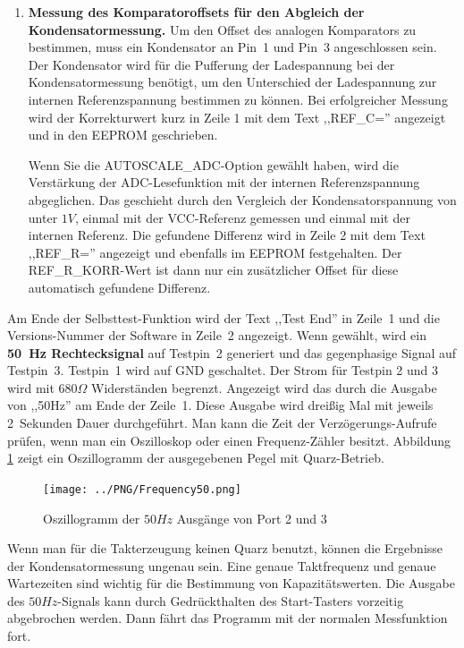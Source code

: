 \begin{enumerate}
\item {\bf Messung des Komparatoroffsets für den Abgleich der Kondensatormessung.}
Um den Offset des analogen Komparators zu bestimmen, muss ein Kondensator an Pin~1 und Pin~3 angeschlossen sein.
Der Kondensator wird für die Pufferung der Ladespannung bei der Kondensatormessung benötigt, um den Unterschied der 
Ladespannung zur internen Referenzspannung bestimmen zu können.
Bei erfolgreicher Messung wird der Korrekturwert kurz in Zeile 1 mit dem Text ,,REF\_C='' angezeigt und in den EEPROM geschrieben.

Wenn Sie die AUTOSCALE\_ADC-Option gewählt haben, wird die Verstärkung der ADC-Lesefunktion mit der
internen Referenzspannung abgeglichen. Das geschieht durch den Vergleich der Kondensatorspannung von unter \(1V\), einmal mit
der VCC-Referenz gemessen und einmal mit der internen Referenz.
Die gefundene Differenz wird in Zeile 2 mit dem Text ,,REF\_R='' angezeigt und ebenfalls im EEPROM festgehalten.
Der REF\_R\_KORR-Wert ist dann nur ein zusätzlicher Offset für diese automatisch gefundene Differenz.

\end{enumerate}

Am Ende der Selbsttest-Funktion wird der Text ,,Test End'' in Zeile~1 und die Versions-Nummer der Software in Zeile~2 angezeigt.
Wenn gewählt, wird ein {\bf 50~Hz Rechtecksignal} auf Testpin~2 generiert und das gegenphasige Signal auf Testpin~3.
Testpin~1 wird auf GND geschaltet. Der Strom für Testpin 2 und 3 wird mit \(680\Omega\) Widerständen begrenzt.
Angezeigt wird das durch die Ausgabe von ,,50Hz'' am Ende der Zeile~1.
Diese Ausgabe wird dreißig Mal mit jeweils 2~Sekunden Dauer durchgeführt.
Man kann die Zeit der Verzögerungs-Aufrufe prüfen, wenn man ein Oszilloskop oder einen
Frequenz-Zähler besitzt. Abbildung \ref{fig:Frequency50} zeigt ein Oszillogramm der ausgegebenen Pegel mit Quarz-Betrieb.

\begin{figure}[H]
\centering
\texttt{[image: ../PNG/Frequency50.png]}
\caption{Oszillogramm der \(50Hz\) Ausgänge von Port 2 und 3}
\label{fig:Frequency50}
\end{figure}

Wenn man für die Takterzeugung keinen Quarz benutzt, können die
Ergebnisse der Kondensatormessung ungenau sein.
Eine genaue Taktfrequenz und genaue Wartezeiten sind wichtig für die Bestimmung von Kapazitätswerten.
Die Ausgabe des \(50Hz\)-Signals kann durch Gedrückthalten des Start-Tasters vorzeitig abgebrochen werden.
Dann fährt das Programm mit der normalen Messfunktion fort.

